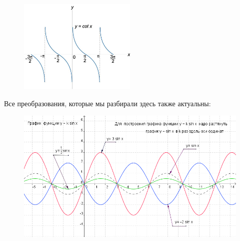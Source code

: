 \begin{figure}[h!]
\centering
\includegraphics[width=0.5\textwidth]{img/ctg.jpg}
\end{figure}
    
\newpage
Все преобразования, которые мы разбирали здесь также актуальны:

    \begin{figure}[h!]
	\centering
	\includegraphics[width=1\textwidth]{img/pr_sin.png}
    \end{figure}